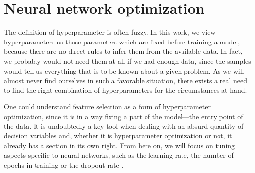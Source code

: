 \chapter{Neural network optimization}\label{ch:optimization}

The definition of hyperparameter is often fuzzy. In this work, we view hyperparameters as those parameters which are fixed before training a model, because there are no direct rules to infer them from the available data. In fact, we probably would not need them at all if we had enough data, since the samples would tell us everything that is to be known about a given problem. As we will almost never find ourselves in such a favorable situation, there exists a real need to find the right combination of hyperparameters for the circumstances at hand.

One could understand feature selection as a form of hyperparameter optimization, since it is in a way fixing a part of the model---the entry point of the data. It is undoubtedly a key tool when dealing with an absurd quantity of decision variables and, whether it is hyperparameter optimization or not, it already has a section in its own right. From here on, we will focus on tuning aspects specific to neural networks, such as the learning rate, the number of epochs in training or the dropout rate \cite{srivastava2014dropout}.